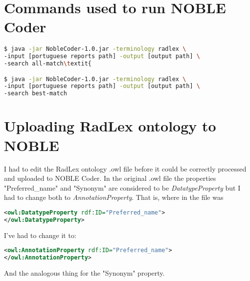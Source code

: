 \label{appendices}

\chapter{Commands used to run NOBLE Coder}
\label{app:commands_run_noble}

\begin{lstlisting}[language=bash]
$ java -jar NobleCoder-1.0.jar -terminology radlex \
-input [portuguese reports path] -output [output path] \
-search all-match\textit{

$ java -jar NobleCoder-1.0.jar -terminology radlex \
-input [portuguese reports path] -output [output path] \
-search best-match
\end{lstlisting}

\chapter{Uploading RadLex ontology to NOBLE}
\label{app:change_radlex_noble}

I had to edit the RadLex ontology .owl file before it could be correctly processed and uploaded to NOBLE Coder. In the original .owl file the properties  "Preferred\_name" and "Synonym" are considered to be \textit{DatatypeProperty} but I had to change both to \textit{AnnotationProperty}. That is, where in the file was

\begin{lstlisting}[language=xml]
<owl:DatatypeProperty rdf:ID="Preferred_name">
</owl:DatatypeProperty>
\end{lstlisting}

I've had to change it to:

\begin{lstlisting}[language=xml]
<owl:AnnotationProperty rdf:ID="Preferred_name">
</owl:AnnotationProperty>
\end{lstlisting}

And the analogous thing for the "Synonym" property.




